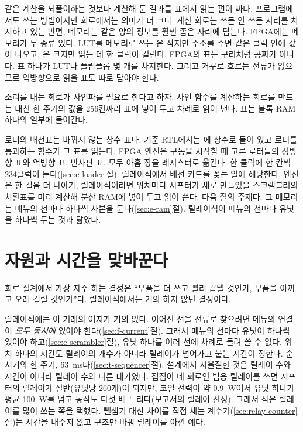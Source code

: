 \Why 같은 계산을 되풀이하는 것보다 계산해 둔 결과를 표에서 읽는 편이 싸다. 프로그램에서도 쓰는 방법이지만
회로에서는 의미가 더 크다. 계산 회로는 쓰든 안 쓰든 자리를 차지하고 있는 반면, 메모리는 같은 양의 정보를
훨씬 좁은 자리에 담는다. FPGA에는 메모리가 두 종류 있다. LUT를 메모리로 쓰는 은 작지만 주소를 주면 같은 클럭 안에 값이 나오고, 은 크지만 읽는 데 한 클럭이
걸린다. FPGA의 표는 구리처럼 공짜가 아니다. 표 하나가 LUT나 플립플롭 몇 개를 차지한다. 그리고 거꾸로 흐르는
전류가 없으므로 역방향으로 읽을 표도 따로 담아야 한다.

\General 소리를 내는 회로가 사인파를 필요로 한다고 하자. 사인 함수를 계산하는 회로를 만드는 대신 한 주기의
값을 256칸짜리 표에 넣어 두고 차례로 읽어 낸다. 표는 블록 RAM 하나의 일부에 들어간다.

\Ours 로터의 배선표는 바뀌지 않는 상수 표다. 기준 RTL에서는 에 상수로 들어 있고
로터를 통과하는 함수가 그 표를 읽는다. FPGA 엔진은 구동을 시작할 때 고른 로터들의 정방향 표와 역방향 표,
반사판 표, 모두 아홉 장을 레지스터로 옮긴다. 한 클럭에 한 칸씩 234클럭이 든다(\ref{sec:e-loader}절).
릴레이식에서 배선 카드를 꽂는 일에 해당한다. 엔진은 한 걸음 더 나아가, 릴레이식이라면 위치마다 시프터가 새로
만들었을 스크램블러의 치환표를 미리 계산해 분산 RAM에 넣어 두고 읽어 쓴다. 다음 절의 주제다. 그 메모리는
메뉴의 선마다 하나씩 사본을 둔다(\ref{sec:e-ram}절). 릴레이식이 메뉴의 선마다 유닛을 하나씩 두는 것과 닮았다.

\section{자원과 시간을 맞바꾼다}\label{sec:tradeoff}

회로 설계에서 가장 자주 하는 결정은 ``부품을 더 쓰고 빨리 끝낼 것인가, 부품을 아끼고 오래 걸릴 것인가''다.
릴레이식에서는 거의 하지 않던 결정이다.

\Relay 릴레이식에는 이 거래의 여지가 거의 없다. 이어진 선을 전류로 찾으려면 메뉴의 연결이 \emph{모두 동시에}
있어야 한다(\ref{sec:f-current}절). 그래서 메뉴의 선마다 유닛이 하나씩 있어야 하고(\ref{sec:c-scrambler}절),
유닛 하나를 여러 선에 차례로 돌려 쓸 수 없다. 위치 하나의 시간도 릴레이의 개수가 아니라 릴레이가 넘어가고 붙는
시간이 정한다. 순서기의 한 주기, 63~ms다(\ref{sec:t-sequencer}절). 설계에서 저울질한 것은 릴레이 수와 시간이
아니라 릴레이 수와 다른 대가였다. 접점이 네 회로인 범용 릴레이를 쓰면 시프터의 릴레이가 절반(유닛당 260개)이
되지만, 코일 전력이 약 0.9~W여서 유닛 하나가 평균 100~W를 넘고 동작도 다섯 배 느리다(보고서의 릴레이 선정).
그래서 작은 릴레이를 많이 쓰는 쪽을 택했다. 뺄셈기 대신 차이를 직접 세는 계수기(\ref{sec:relay-counter}절)는
시간을 내주지 않고 구조만 바꿔 릴레이를 아낀 예다.

